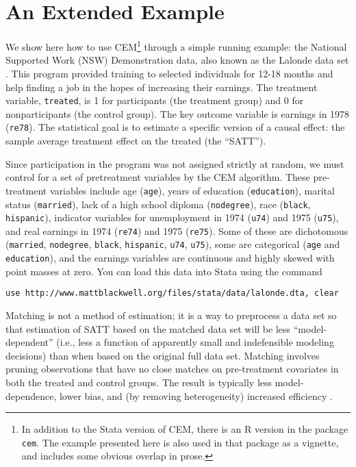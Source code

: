 \documentclass[11pt,titlepage]{article}
\begin{document}
\section{An Extended Example}
We show here how to use CEM\footnote{In addition to the Stata version
  of CEM, there is an R version in the package \texttt{cem}. The
  example presented here is also used in that package as a vignette,
  and includes some obvious overlap in prose.} through a simple
running example: the National Supported Work (NSW) Demonstration data,
also known as the Lalonde data set \citep{Lalonde86}.  This program
provided training to selected individuals for 12-18 months and help
finding a job in the hopes of increasing their earnings.  The
treatment variable, \texttt{treated}, is 1 for participants (the
treatment group) and 0 for nonparticipants (the control group).  The
key outcome variable is earnings in 1978 (\texttt{re78}).  The
statistical goal is to estimate a specific version of a causal effect:
the sample average treatment effect on the treated (the ``SATT'').

Since participation in the program was not assigned strictly at random, we
must control for a set of pretreatment variables by the CEM algorithm.
These pre-treatment variables include age (\texttt{age}), years of
education (\texttt{education}), marital status (\texttt{married}), lack of
a high school diploma (\texttt{nodegree}), race (\texttt{black},
\texttt{hispanic}), indicator variables for unemployment in 1974
(\texttt{u74}) and 1975 (\texttt{u75}), and real earnings in 1974
(\texttt{re74}) and 1975 (\texttt{re75}).  Some of these are dichotomous
(\texttt{married}, \texttt{nodegree}, \texttt{black}, \texttt{hispanic},
\texttt{u74}, \texttt{u75}), some are categorical (\texttt{age} and
\texttt{education}), and the earnings variables are continuous and highly
skewed with point masses at zero. You can load this data into Stata using
the command

\begin{verbatim}
use http://www.mattblackwell.org/files/stata/data/lalonde.dta, clear
\end{verbatim}

Matching is not a method of estimation; it is a way to preprocess a
data set so that estimation of SATT based on the matched data set will
be less ``model-dependent'' (i.e., less a function of apparently small
and indefensible modeling decisions) than when based on the original
full data set.  Matching involves pruning observations that have no
close matches on pre-treatment covariates in both the treated and
control groups.  The result is typically less model-dependence, lower bias,
and (by removing heterogeneity) increased efficiency
\citep{KinZen06,HoImaKin07,IacKinPor12}.
\end{document}

